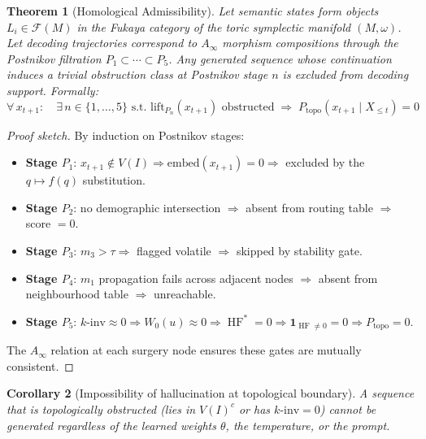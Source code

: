 \documentclass[11pt,a4paper]{article}
\newtheorem{theorem}{Theorem}[section]
\newtheorem{corollary}[theorem]{Corollary}
\DeclareMathOperator{\HF}{HF}
\newcommand{\one}{\mathbf{1}}
\newcommand{\Fuk}{\mathcal{F}}
\begin{document}
\begin{theorem}[Homological Admissibility]
\label{thm:main}
Let semantic states form objects $L_i \in \Fuk(M)$ in the
Fukaya category of the toric symplectic manifold $(M,\omega)$.
Let decoding trajectories correspond to $A_\infty$ morphism
compositions through the Postnikov filtration
$P_1 \subset \cdots \subset P_5$.
Any generated sequence whose continuation induces a trivial
obstruction class at Postnikov stage $n$ is excluded from
decoding support. Formally:
\[
  \forall\, x_{t+1}:\quad
  \exists\, n \in \{1,\ldots,5\} \text{ s.t. }
  \text{lift}_{P_n}(x_{t+1}) \text{ obstructed}
  \;\Longrightarrow\;
  P_{\mathrm{topo}}(x_{t+1} \mid X_{\leq t}) = 0
\]
\end{theorem}

\begin{proof}[Proof sketch]
By induction on Postnikov stages:
\begin{itemize}
  \item \textbf{Stage $P_1$}: $x_{t+1} \notin V(I)
    \Rightarrow \mathrm{embed}(x_{t+1}) = 0
    \Rightarrow$ excluded by the $q \mapsto f(q)$ substitution.
  \item \textbf{Stage $P_2$}: no demographic intersection
    $\Rightarrow$ absent from routing table $\Rightarrow$ score $= 0$.
  \item \textbf{Stage $P_3$}: $m_3 > \tau \Rightarrow$ flagged volatile
    $\Rightarrow$ skipped by stability gate.
  \item \textbf{Stage $P_4$}: $m_1$ propagation fails across adjacent
    nodes $\Rightarrow$ absent from neighbourhood table $\Rightarrow$
    unreachable.
  \item \textbf{Stage $P_5$}: $k\text{-inv} \approx 0
    \Rightarrow W_0(u) \approx 0
    \Rightarrow \HF^* = 0
    \Rightarrow \one_{\HF \neq 0} = 0
    \Rightarrow P_{\mathrm{topo}} = 0$.
\end{itemize}
The $A_\infty$ relation at each surgery node ensures these gates
are mutually consistent.
\end{proof}

\begin{corollary}[Impossibility of hallucination at topological boundary]
A sequence that is topologically obstructed (lies in $V(I)^c$ or
has $k\text{-inv} = 0$) cannot be generated regardless of the
learned weights $\theta$, the temperature, or the prompt.
\end{corollary}

\end{document}

